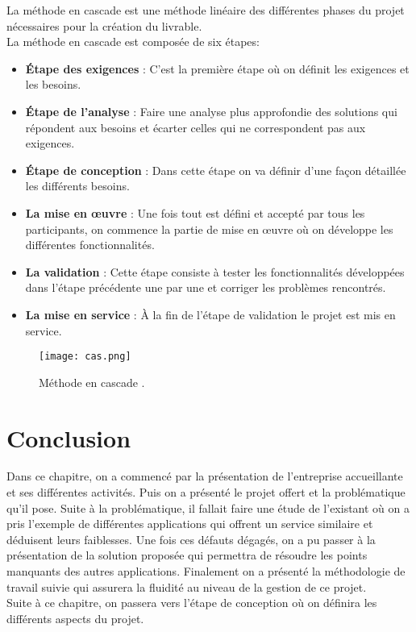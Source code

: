 La méthode en cascade est une méthode linéaire des différentes phases du projet nécessaires pour la création du livrable.\\
\noindent La méthode en cascade est composée de six étapes:
\begin{itemize}
    \item \textbf{Étape des exigences} : C'est la première étape où on définit les exigences et les besoins.
    \item \textbf{Étape de l'analyse} : Faire une analyse plus approfondie des solutions qui répondent aux besoins et écarter celles qui ne correspondent pas aux exigences.
    \item \textbf{Étape de conception} : Dans cette étape on va définir d'une façon détaillée les différents besoins.
    \item \textbf{La mise en œuvre} : Une fois tout est défini et accepté par tous les participants, on commence la partie de mise en œuvre où on développe les différentes fonctionnalités.
    \item \textbf{La validation} : Cette étape consiste à tester les fonctionnalités développées dans l'étape précédente une par une et corriger les problèmes rencontrés.
    \item \textbf{La mise en service} : À la fin de l'étape de validation le projet est mis en service.
\end{itemize}
\vspace{1cm}
\begin{figure}[H]
    \centering
    \texttt{[image: cas.png]}
    \captionsetup{justification=centering}
    \caption{Méthode en cascade .}\cite{cascade}
    \label{fig:cascade}
\end{figure}

\section{Conclusion}
Dans ce chapitre, on a commencé par la présentation de l'entreprise accueillante et ses différentes activités. Puis on a présenté le projet offert et la problématique qu'il pose. Suite à la problématique, il fallait faire une étude de l'existant où on a pris l'exemple de différentes applications qui offrent un service similaire et déduisent leurs faiblesses. Une fois ces défauts dégagés, on a pu passer à la présentation de la solution proposée qui permettra de résoudre les points manquants des autres applications. Finalement on a présenté la méthodologie de travail suivie qui assurera la fluidité au niveau de la gestion de ce projet.\\
Suite à ce chapitre, on passera vers l'étape de conception où on définira les différents aspects du projet.